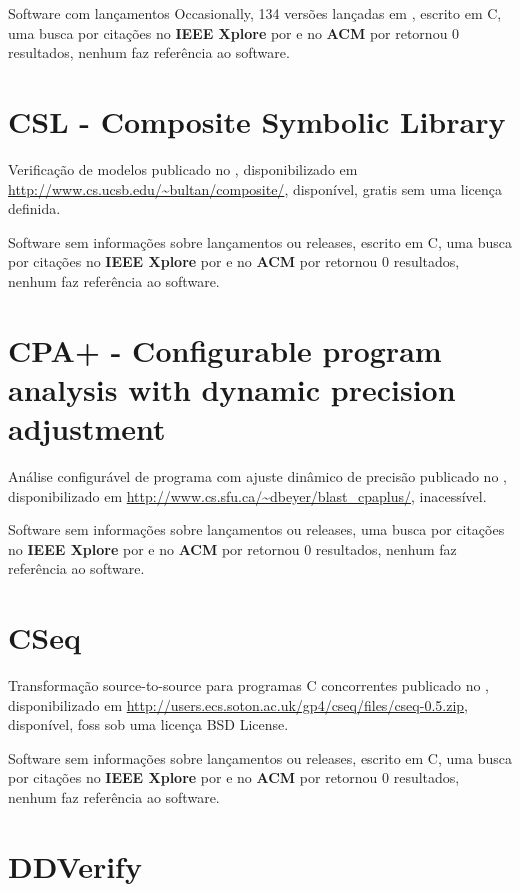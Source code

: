 Software com lançamentos Occasionally,
134 versões lançadas
em ,
escrito em C,
uma busca por citações no {\bf IEEE Xplore} por
\texttt{}
e no {\bf ACM} por
\texttt{}
retornou
0 resultados,
nenhum faz referência ao software.



\section{CSL - Composite Symbolic Library}

Verificação de modelos
publicado no  ,
disponibilizado em \url{http://www.cs.ucsb.edu/~bultan/composite/},
disponível,
gratis
sem uma licença definida.

Software sem informações sobre lançamentos ou releases,
escrito em C,
uma busca por citações no {\bf IEEE Xplore} por
\texttt{}
e no {\bf ACM} por
\texttt{}
retornou
0 resultados,
nenhum faz referência ao software.



\section{CPA+ - Configurable program analysis with dynamic precision adjustment}

Análise configurável de programa com ajuste dinâmico de precisão
publicado no  ,
disponibilizado em \url{http://www.cs.sfu.ca/~dbeyer/blast_cpaplus/},
inacessível.

Software sem informações sobre lançamentos ou releases,
uma busca por citações no {\bf IEEE Xplore} por
\texttt{}
e no {\bf ACM} por
\texttt{}
retornou
0 resultados,
nenhum faz referência ao software.



\section{CSeq}

Transformação source-to-source para programas C concorrentes
publicado no  ,
disponibilizado em \url{http://users.ecs.soton.ac.uk/gp4/cseq/files/cseq-0.5.zip},
disponível,
foss
sob uma licença BSD License.

Software sem informações sobre lançamentos ou releases,
escrito em C,
uma busca por citações no {\bf IEEE Xplore} por
\texttt{}
e no {\bf ACM} por
\texttt{}
retornou
0 resultados,
nenhum faz referência ao software.



\section{DDVerify}

